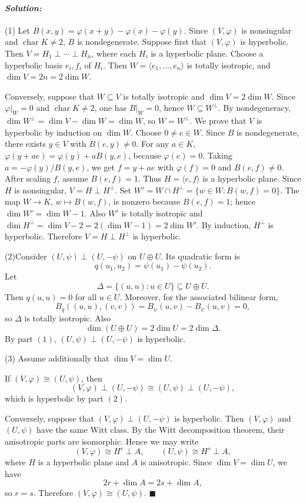 \documentclass[12pt, a4paper]{article}
\newenvironment{solution}
  {\paragraph{\textit{Solution:}}\par\medskip}
  {\hfill$\blacksquare$\vspace{0.1cm}}
\begin{document}
\begin{solution}
    (1) Let $B(x,y)=\varphi(x+y)-\varphi(x)-\varphi(y)$. Since $(V,\varphi)$ is nonsingular and $\operatorname{char}K\neq 2$, $B$ is nondegenerate. Suppose first that $(V,\varphi)$ is hyperbolic. Then $V=H_1\perp\cdots\perp H_n$, where each $H_i$ is a hyperbolic plane. Choose a hyperbolic basis $e_i,f_i$ of $H_i$. Then $W=\langle e_1,\dots,e_n\rangle$ is totally isotropic, and $\dim V=2n=2\dim W$. 
    
    Conversely, suppose that $W\subseteq V$ is totally isotropic and $\dim V=2\dim W$. Since $\varphi|_W=0$ and $\operatorname{char}K\neq 2$, one has $B|_{W}=0$, hence $W\subseteq W^\perp$. By nondegeneracy, $\dim W^\perp=\dim V-\dim W=\dim W$, so $W=W^\perp$. We prove that $V$ is hyperbolic by induction on $\dim W$. Choose $0\neq e\in W$. Since $B$ is nondegenerate, there exists $y\in V$ with $B(e,y)\neq 0$. For any $a\in K$, $\varphi(y+ae)=\varphi(y)+aB(y,e)$, because $\varphi(e)=0$. Taking $a=-\varphi(y)/B(y,e)$, we get $f=y+ae$ with $\varphi(f)=0$ and $B(e,f)\neq 0$. After scaling $f$, assume $B(e,f)=1$. Thus $H=\langle e,f\rangle$ is a hyperbolic plane. Since $H$ is nonsingular, $V=H\perp H^\perp$. Set $W'=W\cap H^\perp=\{w\in W:B(w,f)=0\}$. The map $W\to K$, $w\mapsto B(w,f)$, is nonzero because $B(e,f)=1$; hence $\dim W'=\dim W-1$. Also $W'$ is totally isotropic and $\dim H^\perp=\dim V-2=2(\dim W-1)=2\dim W'$. By induction, $H^\perp$ is hyperbolic. Therefore $V=H\perp H^\perp$ is hyperbolic.

    (2)Consider $(U,\psi)\perp (U,-\psi)$ on $U\oplus U$. Its quadratic form is \[ q(u_1,u_2)=\psi(u_1)-\psi(u_2). \] Let \[ \Delta=\{(u,u):u\in U\}\subseteq U\oplus U. \] Then $q(u,u)=0$ for all $u\in U$. Moreover, for the associated bilinear form, \[ B_q((u,u),(v,v))=B_\psi(u,v)-B_\psi(u,v)=0, \] so $\Delta$ is totally isotropic. Also \[ \dim(U\oplus U)=2\dim U=2\dim \Delta. \] By part $(1)$, $(U,\psi)\perp (U,-\psi)$ is hyperbolic.

    (3) Assume additionally that $\dim V=\dim U$.

If $(V,\varphi)\cong (U,\psi)$, then
\[
(V,\varphi)\perp (U,-\psi)
\cong
(U,\psi)\perp (U,-\psi),
\]
which is hyperbolic by part $(2)$.

Conversely, suppose that $(V,\varphi)\perp (U,-\psi)$ is hyperbolic. Then
$(V,\varphi)$ and $(U,\psi)$ have the same Witt class. By the Witt
decomposition theorem, their anisotropic parts are isomorphic. Hence we may
write
\[
(V,\varphi)\cong H^r\perp A,\qquad
(U,\psi)\cong H^s\perp A,
\]
where $H$ is a hyperbolic plane and $A$ is anisotropic. Since
$\dim V=\dim U$, we have
\[
2r+\dim A=2s+\dim A,
\]
so $r=s$. Therefore $(V,\varphi)\cong (U,\psi)$.
\end{solution}
\end{document}
